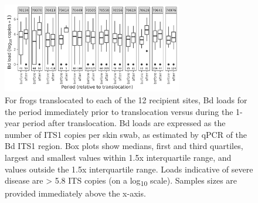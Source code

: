 \documentclass[9pt,twoside,lineno]{pnas-new}
\begin{document}
\newpage

\begin{figure}

{\centering \includegraphics[width=0.7\textwidth]{figures/bdload_beforeafter.png}

}

\caption{\label{fig-bdload-beforeafter}For frogs translocated to each of
the 12 recipient sites, Bd loads for the period immediately prior to
translocation versus during the 1-year period after translocation. Bd
loads are expressed as the number of ITS1 copies per skin swab, as
estimated by qPCR of the Bd ITS1 region. Box plots show medians, first
and third quartiles, largest and smallest values within 1.5x
interquartile range, and values outside the 1.5x interquartile range.
Loads indicative of severe disease are \textgreater{} 5.8 ITS copies (on
a log\textsubscript{10} scale). Samples sizes are provided immediately
above the x-axis.}

\end{figure}\clearpage

\newpage
\end{document}
